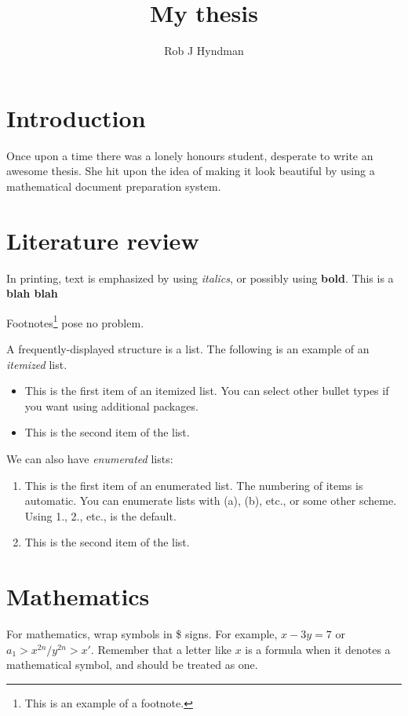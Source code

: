 \documentclass[a4paper,11pt]{article}
\begin{document}
  
\title{My thesis}
\author{Rob J Hyndman}
\maketitle

\section{Introduction}

Once upon a time there was a lonely honours student, desperate to write
an awesome thesis. She hit upon the idea of making it look beautiful by using a mathematical document
preparation system.



\section{Literature review}

In printing, text is emphasized by using \emph{italics}, or possibly using \textbf{bold}.  This is a \textbf{blah blah}

Footnotes\footnote{This is an example of a footnote.} pose no problem.

A frequently-displayed structure is a list. The following is an example of an \emph{itemized} list.
\begin{itemize}
   \item  This is the first item of an itemized list. You can select other bullet types if you want using additional packages.

   \item  This is the second item of the list.
\end{itemize}
We can also have \emph{enumerated} lists:
\begin{enumerate}
  \item This is the first item of an enumerated list. The numbering of items is automatic. You can enumerate lists with (a), (b), etc., or some other scheme. Using 1., 2., etc., is the default.

  \item This is the second item of the list. 
\end{enumerate}

\section{Mathematics}

For mathematics, wrap symbols in \$ signs. For example, $x-3y=7$
or $a_{1} > x^{2n} / y^{2n} > x' $.
Remember that a letter like $x$ is a formula when it denotes a
mathematical symbol, and should be treated as one.
\end{document}

